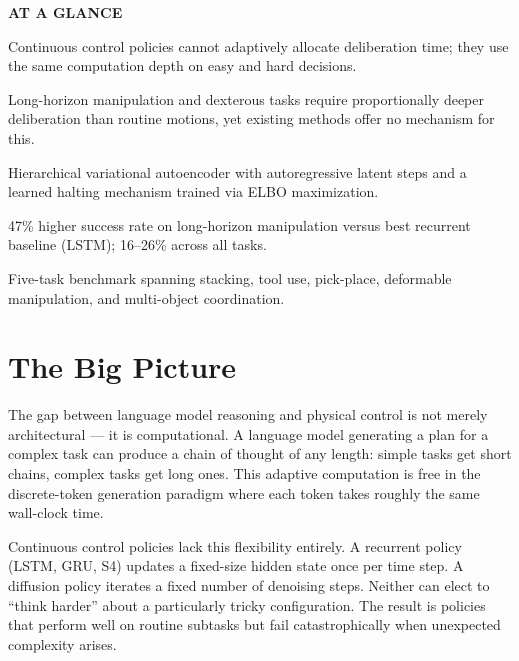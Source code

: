 \documentclass[10pt,twocolumn]{article}
\begin{document}
\begin{mdframed}[backgroundcolor=boxgray,linecolor=rulered,linewidth=1pt,
    innerleftmargin=6pt,innerrightmargin=6pt,
    innertopmargin=6pt,innerbottommargin=6pt]
\textbf{\small AT A GLANCE}\par\vspace{4pt}
\begin{description}[leftmargin=0pt,labelsep=4pt,itemsep=2pt,parsep=0pt,
    font=\small\bfseries]
  \item[Problem:] Continuous control policies cannot adaptively allocate
    deliberation time; they use the same computation depth on easy and
    hard decisions.
  \item[Why it matters:] Long-horizon manipulation and dexterous tasks
    require proportionally deeper deliberation than routine motions,
    yet existing methods offer no mechanism for this.
  \item[Method:] Hierarchical variational autoencoder with autoregressive
    latent steps and a learned halting mechanism trained via ELBO
    maximization.
  \item[Result:] 47\% higher success rate on long-horizon manipulation
    versus best recurrent baseline (LSTM); 16--26\% across all tasks.
  \item[Evidence:] Five-task benchmark spanning stacking, tool use,
    pick-place, deformable manipulation, and multi-object coordination.
\end{description}
\end{mdframed}

\section{The Big Picture}

The gap between language model reasoning and physical control is
not merely architectural --- it is computational. A language model
generating a plan for a complex task can produce a chain of thought
of any length: simple tasks get short chains, complex tasks get long
ones. This adaptive computation is free in the discrete-token generation
paradigm where each token takes roughly the same wall-clock time.

Continuous control policies lack this flexibility entirely. A recurrent
policy (LSTM, GRU, S4) updates a fixed-size hidden state once per time
step. A diffusion policy iterates a fixed number of denoising steps.
Neither can elect to ``think harder'' about a particularly tricky
configuration. The result is policies that perform well on routine
subtasks but fail catastrophically when unexpected complexity arises.
\end{document}

